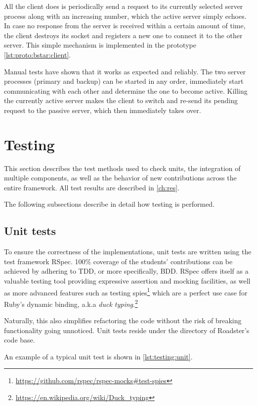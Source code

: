 All the client does is periodically send a request to its currently selected
server process along with an increasing number, which the active server simply
echoes. In case no response from the server is received within a certain amount
of time, the client destroys its socket and registers a new one to connect it
to the other server. This simple mechanism is implemented in the prototype
\autoref{lst:proto:bstar:client}.


Manual tests have shown that it works as expected and reliably. The two server
processes (primary and backup) can be started in any order, immediately start
communicating with each other and determine the one to become active. Killing
the currently active server makes the client to switch and re-send its pending
request to the passive server, which then immediately takes over.


\section{Testing}\label{sec:approach:testing}
This section describes the test methods used to check units, the integration of
multiple components, as well as the behavior of new contributions across the
entire framework.  All test results are described in \autoref{ch:res}.

The following subsections describe in detail how testing is performed.

\subsection{Unit tests}
To ensure the correctness of the implementations, unit tests are written using the test framework
RSpec. 100\% coverage of the students' contributions can be achieved by
adhering to \gls{TDD}, or more specifically, \gls{BDD}. RSpec offers itself as
a valuable testing tool providing expressive assertion and mocking
facilities, as well as more advanced features such as testing spies\footnote{\url{https://github.com/rspec/rspec-mocks\#test-spies}} which
are a perfect use case for Ruby's dynamic binding, a.k.a \emph{duck typing}.\footnote{\url{https://en.wikipedia.org/wiki/Duck_typing}}

Naturally, this also simplifies refactoring the code without the risk of
breaking functionality going unnoticed. Unit tests reside under the 
directory of Roadster's code base.

An example of a typical unit test is shown in \autoref{lst:testing:unit}.

